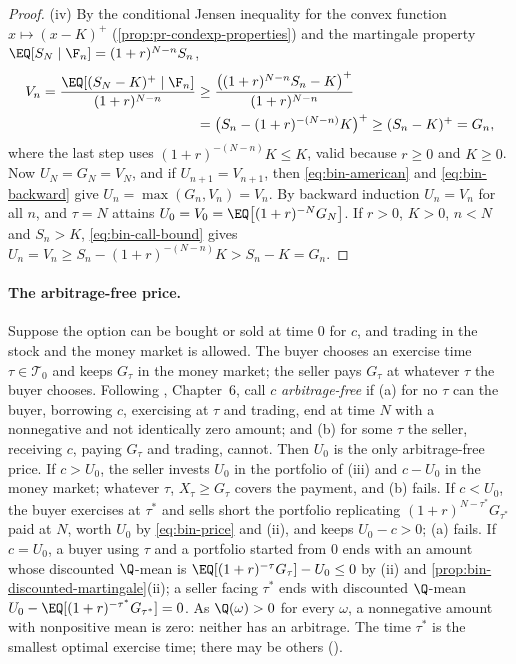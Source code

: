 \begin{proof}
(iv) By the conditional Jensen inequality for the convex function $x\mapsto(x-K)^+$
(\cref{prop:pr-condexp-properties}) and the martingale property
$\EQ[S_N\mid\F_n]=(1+r)^{N-n}S_n$,
\begin{equation}\label{eq:bin-call-bound}
\begin{split}
  V_n=\frac{\EQ[(S_N-K)^+\mid\F_n]}{(1+r)^{N-n}}
  &\ge\frac{\big((1+r)^{N-n}S_n-K\big)^+}{(1+r)^{N-n}}\\
  &=\big(S_n-(1+r)^{-(N-n)}K\big)^+\ge(S_n-K)^+=G_n,
\end{split}
\end{equation}
where the last step uses $(1+r)^{-(N-n)}K\le K$, valid because $r\ge0$ and $K\ge0$. Now
$U_N=G_N=V_N$, and if $U_{n+1}=V_{n+1}$, then \eqref{eq:bin-american} and
\eqref{eq:bin-backward} give $U_n=\max(G_n,V_n)=V_n$. By backward induction $U_n=V_n$ for
all $n$, and $\tau=N$ attains $U_0=V_0=\EQ\big[(1+r)^{-N}G_N\big]$. If $r>0$, $K>0$,
$n<N$ and $S_n>K$, \eqref{eq:bin-call-bound} gives
$U_n=V_n\ge S_n-(1+r)^{-(N-n)}K>S_n-K=G_n$.
\end{proof}

\paragraph{The arbitrage-free price.} Suppose the option can be bought or sold at time $0$
for $c$, and trading in the stock and the money market is allowed. The buyer chooses an
exercise time $\tau\in\mathcal T_0$ and keeps $G_\tau$ in the money market; the seller pays
$G_\tau$ at whatever $\tau$ the buyer chooses. Following \textcite{follmer-schied},
Chapter~6, call $c$ \emph{arbitrage-free} if (a) for no $\tau$ can the buyer, borrowing $c$,
exercising at $\tau$ and trading, end at time $N$ with a nonnegative and not identically
zero amount; and (b) for some $\tau$ the seller, receiving $c$, paying $G_\tau$ and trading,
cannot. Then $U_0$ is the only arbitrage-free price. If $c>U_0$, the seller invests $U_0$ in
the portfolio of (iii) and $c-U_0$ in the money market; whatever $\tau$, $X_\tau\ge G_\tau$
covers the payment, and (b) fails. If $c<U_0$, the buyer exercises at $\tau^*$ and sells
short the portfolio replicating $(1+r)^{N-\tau^*}G_{\tau^*}$ paid at $N$, worth $U_0$ by
\eqref{eq:bin-price} and (ii), and keeps $U_0-c>0$; (a) fails. If $c=U_0$, a buyer using
$\tau$ and a portfolio started from $0$ ends with an amount whose discounted $\Q$-mean is
$\EQ[(1+r)^{-\tau}G_\tau]-U_0\le0$ by (ii) and \cref{prop:bin-discounted-martingale}(ii);
a seller facing $\tau^*$ ends with discounted $\Q$-mean $U_0-\EQ[(1+r)^{-\tau^*}G_{\tau^*}]=0$.
As $\Q(\omega)>0$ for every $\omega$, a nonnegative amount with nonpositive mean is zero:
neither has an arbitrage. The time $\tau^*$ is the smallest optimal exercise time; there may
be others ().

